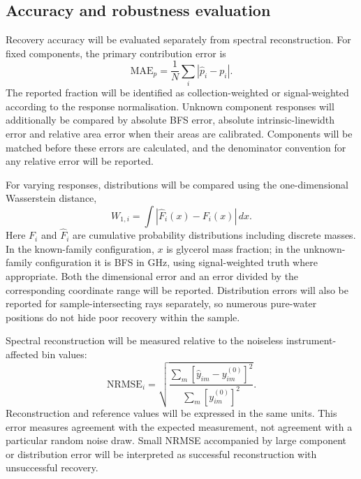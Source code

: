 \documentclass[11pt]{article}
\begin{document}

\subsection{Accuracy and robustness evaluation}

Recovery accuracy will be evaluated separately from spectral reconstruction. For fixed components, the primary contribution error is
\begin{equation}
 \mathrm{MAE}_{p}=\frac{1}{N}\sum_i|\widehat p_i-p_i|.
 \label{eq:proportion_mae}
\end{equation}
The reported fraction will be identified as collection-weighted or signal-weighted according to the response normalisation. Unknown component responses will additionally be compared by absolute BFS error, absolute intrinsic-linewidth error and relative area error when their areas are calibrated. Components will be matched before these errors are calculated, and the denominator convention for any relative error will be reported.

For varying responses, distributions will be compared using the one-dimensional Wasserstein distance,
\begin{equation}
 W_{1,i}=\int|\widehat F_i(x)-F_i(x)|\,dx.
 \label{eq:wasserstein}
\end{equation}
Here $F_i$ and $\widehat F_i$ are cumulative probability distributions including discrete masses. In the known-family configuration, $x$ is glycerol mass fraction; in the unknown-family configuration it is BFS in GHz, using signal-weighted truth where appropriate. Both the dimensional error and an error divided by the corresponding coordinate range will be reported. Distribution errors will also be reported for sample-intersecting rays separately, so numerous pure-water positions do not hide poor recovery within the sample.

Spectral reconstruction will be measured relative to the noiseless instrument-affected bin values:
\begin{equation}
 \mathrm{NRMSE}_i=
 \sqrt{\frac{\sum_m[\widehat y_{im}-y^{(0)}_{im}]^2}
 {\sum_m[y^{(0)}_{im}]^2}}.
 \label{eq:spectral_nrmse}
\end{equation}
Reconstruction and reference values will be expressed in the same units. This error measures agreement with the expected measurement, not agreement with a particular random noise draw. Small NRMSE accompanied by large component or distribution error will be interpreted as successful reconstruction with unsuccessful recovery.
\end{document}
